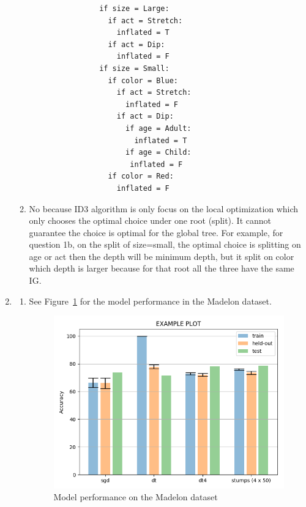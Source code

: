 \documentclass{article}
\begin{document}
\begin{enumerate}
\begin{enumerate}
            \begin{verbatim}
                if size = Large:
                  if act = Stretch:
                    inflated = T
                  if act = Dip:
                    inflated = F
                if size = Small:
                  if color = Blue:
                    if act = Stretch:
                      inflated = F
                    if act = Dip:
                      if age = Adult:
                        inflated = T
                      if age = Child:
                       inflated = F
                  if color = Red:
                    inflated = F
            \end{verbatim}

            \item %
            No because ID3 algorithm is only focus on the local optimization which only chooses the optimal choice under one root (split). It cannot guarantee the choice is optimal for the global tree. For example, for question 1b, on the split of size=small, the optimal choice is splitting on age or act then the depth will be minimum depth, but it split on color which depth is larger because for that root all the three have the same IG.
        \end{enumerate}

        \item %
        \begin{enumerate}
            \item %
            See Figure~\ref{fig:model_performance} for the model performance in the Madelon dataset.
            \begin{figure}
                \centering
                \includegraphics[width=\textwidth]{plot.png}
                \caption{Model performance on the Madelon dataset}
                \label{fig:model_performance}
            \end{figure}
	

\end{enumerate}
\end{enumerate}
\end{document}
